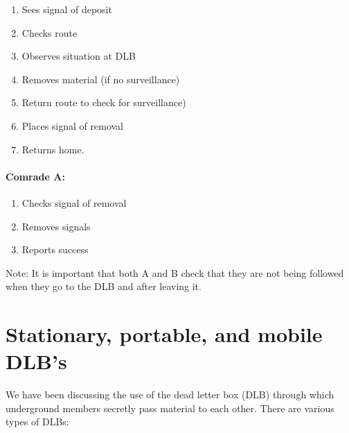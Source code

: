 \begin{enumerate}
\tightlist
\item
  Sees signal of deposit
\item
  Checks route
\item
  Observes situation at DLB
\item
  Removes material (if no surveillance)
\item
  Return route to check for surveillance)
\item
  Places signal of removal
\item
  Returns home.
\end{enumerate}

\paragraph{Comrade A:}

\begin{enumerate}
\tightlist
\item
  Checks signal of removal
\item
  Removes signals
\item
  Reports success
\end{enumerate}

Note: It is important that both A and B check that they are not being
followed when they go to the DLB and after leaving it.

\section{Stationary, portable, and mobile DLB's}

We have been discussing the use of the dead letter box (DLB) through
which underground members secretly pass material to each other. There
are various types of DLBs:

